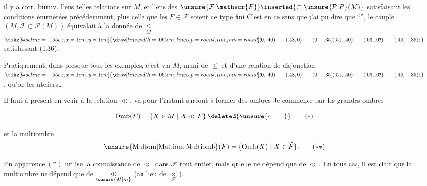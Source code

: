 
il y a corr. biuniv.  l'ens  telles relations sur $M$, et l'ens des $\unsure{\mathcal{F}|\mathscr{F}}\inserted{\subset\unsure{\mathcal{P}|P}(M)}$ satisfaisant les conditions énumérées précédemment, plus celle que les $F\in\mathcal{F}$ soient  de type fini C'est en ce sens que j'ai pu dire que ``'', le couple $(M,\mathcal{F}\subset\mathcal{P}(M))$ équivalait à  la donnée de $\underset{M}{\leqslant}$   $\mathrel{\tikz[baseline=-.55ex,x=1em,y=1em]{\draw[line width=.065em,line cap=round,line join=round] (0,.40)--(.48,0)--(0,-.35) (.51,.40)--(.03,.02)--(.49,-.35);}}$ satisfaisant (1.36).


Pratiquement, dans presque tous les exemples, c'est via $M$, muni de $\leq$ et d'une relation de disjonction $\mathrel{\tikz[baseline=-.55ex,x=1em,y=1em]{\draw[line width=.065em,line cap=round,line join=round] (0,.40)--(.48,0)--(0,-.35) (.51,.40)--(.03,.02)--(.49,-.35);}}$, qu'on  les ateliers\ldots

Il faut à présent en venir à la relation $\ll$.   va pour l'instant  surtout à former des ombres Je commence par les grandes ombres

\[
 \mathrm{Omb}(F)=\{X\in M\mid X\ll F\}\,\deleted{\unsure{\subset|=}}
 \tag*{$(*)$}
\]

et la multiombre
\[
 \unsure{\mathrm{Multom}|\mathrm{Multiom}|\mathrm{Multiomb}}(F)=\{\mathrm{Omb}(X)\mid X\in\widetilde F\}.
 \tag*{$(**)$}
\]

En apparence $(*)$ utilise la connaissance de $\ll$ dans $\mathcal{F}$ tout entier, mais    qu'elle ne dépend que de $\ll$. En tous cas, il est clair que la multiombre ne dépend que de $\underset{\unsure{M|m}}{\ll}$ (au lieu de $\underset{\mathcal{F}}{\ll}$).

